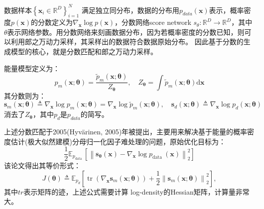 
数据样本$\left\{\mathbf{x}_i \in \mathbb{R}^D\right\}_{i=1}^N$ 满足独立同分布，数据的分布用$p_{data}(\mathbf{x})$表示，概率密度$p(\mathbf{x})$的分数定义为$\nabla_{\mathbf{x}} \log p(\mathbf{x})$，分数网络score network $s_{\theta}:\mathbb{R}^D \rightarrow \mathbb{R}^D$，其中$\theta$表示网络参数。用分数网络来刻画数据分布，因为若概率密度的分数已知，则可以利用郎之万动力采样，其采样出的数据符合数据原始分布。 因此基于分数的生成模型的核心，就是分数匹配和郎之万动力采样。

能量模型定义为：
\begin{equation}
p_m(\mathbf{x} ; \boldsymbol{\theta})=\frac{\tilde{p}_m(\mathbf{x} ; \boldsymbol{\theta})}{Z_{\boldsymbol{\theta}}}, \quad Z_{\boldsymbol{\theta}}=\int \tilde{p}_m(\mathbf{x} ; \boldsymbol{\theta}) \mathrm{d} \mathbf{x}
\end{equation}
其分数则为：
\begin{equation}
\mathbf{s}_m(\mathbf{x} ; \boldsymbol{\theta}) \triangleq \nabla_{\mathbf{x}} \log p_m(\mathbf{x} ; \boldsymbol{\theta})=\nabla_{\mathbf{x}} \log \tilde{p}_m(\mathbf{x} ; \boldsymbol{\theta}), \quad  \mathbf{s}_d(\mathbf{x} ; \boldsymbol{\theta}) \triangleq \nabla_{\mathbf{x}} \log p_d(\mathbf{x} ; \boldsymbol{\theta})
\end{equation}
消去了$Z_{\boldsymbol{\theta}}$，其中$p_d$是$p_{data}$的简写。




上述分数匹配于2005(Hyvärinen, 2005)年被提出，主要用来解决基于能量的概率密度估计(极大似然建模)分母归一化因子难处理的问题，原始优化目标为：
\begin{equation}
\frac{1}{2} \mathbb{E}_{p_{\text {data }}}\left[\left\|\mathbf{s}_{\boldsymbol{\theta}}(\mathbf{x})-\nabla_{\mathbf{x}} \log p_{\text {data }}(\mathbf{x})\right\|_2^2\right]
\end{equation}
该论文得出其等价形式：
\begin{equation}
\label{orig:score-loss}
J(\boldsymbol{\theta}) \triangleq \mathbb{E}_{p_d}\left[\operatorname{tr}\left(\nabla_{\mathbf{x}} \mathbf{s}_m(\mathbf{x} ; \boldsymbol{\theta})\right)+\frac{1}{2}\left\|\mathbf{s}_m(\mathbf{x} ; \boldsymbol{\theta})\right\|_2^2\right],
\end{equation}
其中$tr$表示矩阵的迹，上述公式需要计算 log-density的Hessian矩阵，计算量非常大。

